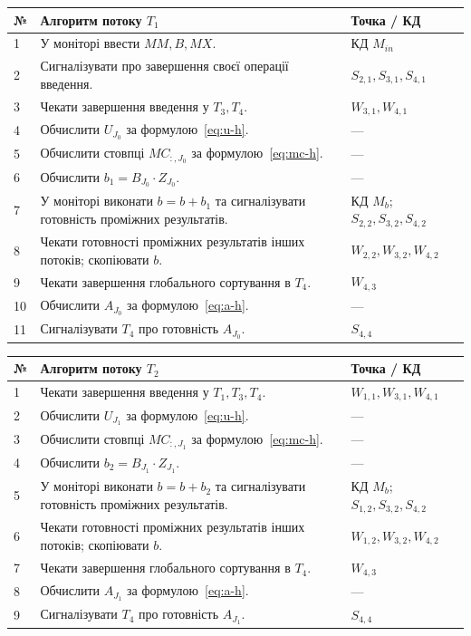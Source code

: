 \documentclass[12pt,a4paper]{article}
\begin{document}
\begin{longtable}{|p{0.65cm}|p{10.6cm}|p{3.0cm}|}
\hline
\textbf{№}&\textbf{Алгоритм потоку $T_1$}&\textbf{Точка / КД}\\\hline
1&У моніторі ввести $MM,B,MX$.&КД $M_{in}$\\\hline
2&Сигналізувати про завершення своєї операції введення.&$S_{2,1},S_{3,1},S_{4,1}$\\\hline
3&Чекати завершення введення у $T_3,T_4$.&$W_{3,1},W_{4,1}$\\\hline
4&Обчислити $U_{J_0}$ за формулою~\eqref{eq:u-h}.&---\\\hline
5&Обчислити стовпці $MC_{:,J_0}$ за формулою~\eqref{eq:mc-h}.&---\\\hline
6&Обчислити $b_1=B_{J_0}\cdot Z_{J_0}$.&---\\\hline
7&У моніторі виконати $b=b+b_1$ та сигналізувати готовність проміжних результатів.&КД $M_b$; $S_{2,2},S_{3,2},S_{4,2}$\\\hline
8&Чекати готовності проміжних результатів інших потоків; скопіювати $b$.&$W_{2,2},W_{3,2},W_{4,2}$\\\hline
9&Чекати завершення глобального сортування в $T_4$.&$W_{4,3}$\\\hline
10&Обчислити $A_{J_0}$ за формулою~\eqref{eq:a-h}.&---\\\hline
11&Сигналізувати $T_4$ про готовність $A_{J_0}$.&$S_{4,4}$\\\hline
\end{longtable}

\begin{longtable}{|p{0.65cm}|p{10.6cm}|p{3.0cm}|}
\hline
\textbf{№}&\textbf{Алгоритм потоку $T_2$}&\textbf{Точка / КД}\\\hline
1&Чекати завершення введення у $T_1,T_3,T_4$.&$W_{1,1},W_{3,1},W_{4,1}$\\\hline
2&Обчислити $U_{J_1}$ за формулою~\eqref{eq:u-h}.&---\\\hline
3&Обчислити стовпці $MC_{:,J_1}$ за формулою~\eqref{eq:mc-h}.&---\\\hline
4&Обчислити $b_2=B_{J_1}\cdot Z_{J_1}$.&---\\\hline
5&У моніторі виконати $b=b+b_2$ та сигналізувати готовність проміжних результатів.&КД $M_b$; $S_{1,2},S_{3,2},S_{4,2}$\\\hline
6&Чекати готовності проміжних результатів інших потоків; скопіювати $b$.&$W_{1,2},W_{3,2},W_{4,2}$\\\hline
7&Чекати завершення глобального сортування в $T_4$.&$W_{4,3}$\\\hline
8&Обчислити $A_{J_1}$ за формулою~\eqref{eq:a-h}.&---\\\hline
9&Сигналізувати $T_4$ про готовність $A_{J_1}$.&$S_{4,4}$\\\hline
\end{longtable}
\end{document}
